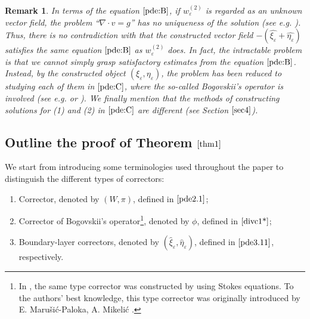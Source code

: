 \documentclass[13pt,CJK]{article}
\theoremstyle{plain}                       %
\newtheorem{remark}[lemma]{Remark}
\theoremstyle{remark}
\numberwithin{equation}{section}
\begin{document}
\begin{remark}
\emph{In terms of the equation $\eqref{pde:B}$,
if $w_\varepsilon^{(2)}$ is regarded as an unknown vector field,
the problem ``$\nabla\cdot v =g$'' has no uniqueness of the solution  
(see e.g. \cite[Theorem III.3.1]{Galdi11}).
Thus, there is no contradiction with that the constructed vector field $-(\hat{\xi_{\varepsilon}}+\hat{\eta_{\varepsilon}})$ satisfies
the same equation $\eqref{pde:B}$ as $w_\varepsilon^{(2)}$ does.
In fact, the intractable problem is that we cannot simply grasp satisfactory  estimates from the equation $\eqref{pde:B}$. Instead, by the constructed object $(\xi_{\varepsilon},\eta_{\varepsilon})$, the problem has been reduced to studying each of them in $\eqref{pde:C}$, where 
the so-called Bogovskii's operator is involved (see e.g. \cite{Bogovskii79} 
or \cite[Section III.3]{Galdi11}).   
We finally mention that the methods of constructing solutions
for (1) and (2) in $\eqref{pde:C}$ are different (see Section $\ref{sec4}$).}
\end{remark}





\subsection{\centering Outline the proof of Theorem $\ref{thm1}$}\label{subsec:1.4}


\noindent
We start from introducing some terminologies used throughout the paper to distinguish the different types of correctors:
\begin{enumerate}
  \item Corrector, denoted by
$(W,\pi)$, defined in $\eqref{pde2.1}$;
  \item Corrector of Bogovskii's  operator\footnote{
In \cite{Balazi-Allaire-Omnes24,Shen20}, the same type corrector
was constructed by using Stokes equations. To the authors' best knowledge,
this type corrector was originally introduced by
E. Maru\v{s}i\'{c}-Paloka, A. Mikeli\'{c} \cite{Marusi-Mikelic96}.}, denoted by $\phi$, defined in $\eqref{divc1*}$;
  \item Boundary-layer correctors, denoted by
$(\hat{\xi}_{\varepsilon},\hat{\eta}_{\varepsilon})$, defined in
$\eqref{pde3.11}$, respectively.
\end{enumerate}
\end{document}
